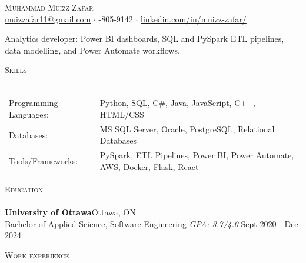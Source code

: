 \documentclass[a4paper]{article}
\newcommand{\lineunder} {
    \vspace*{-8pt} \\
    \hspace*{-18pt} \hrulefill \\
}
\newcommand{\header} [1] {
    {\hspace*{-18pt}\vspace*{6pt} \textsc{#1}}
    \vspace*{-6pt} \lineunder
}
\begin{document}
\vspace*{-40pt}

\vspace*{-10pt}
\begin{center}
	{\Huge \scshape {Muhammad Muizz Zafar}}\\
	\faSend \space \href{mailto:muizzafar11@gmail.com}{muizzafar11@gmail.com} $\cdot$ \faPhoneSquare {}-805-9142 $\cdot$ \faLinkedinSquare \space \href{https://www.linkedin.com/in/muizz-zafar/}{linkedin.com/in/muizz-zafar/}
	\\
\end{center}
\begin{center}
Analytics developer: Power BI dashboards, SQL and PySpark ETL pipelines, data modelling, and Power Automate workflows.
\end{center}

\header{Skills}
\begin{tabular}{ l l }
	Programming Languages:        & Python, SQL, C\#, Java, JavaScript, C++, HTML/CSS \\
	Databases:                    & MS SQL Server, Oracle, PostgreSQL, Relational Databases \\
	Tools/Frameworks:             & PySpark, ETL Pipelines, Power BI, Power Automate, AWS, Docker, Flask, React \\
\end{tabular}
\vspace{2mm}

\header{Education}
\textbf{University of Ottawa}\hfill Ottawa, ON\\
Bachelor of Applied Science, Software Engineering \textit{GPA: 3.7/4.0} \hfill Sept 2020 - Dec 2024\\
\vspace{2mm}

\header{Work experience}
\vspace{1.5mm}
\end{document}
